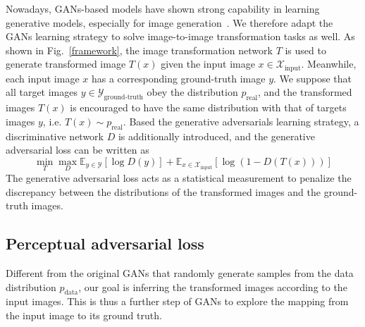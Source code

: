 \documentclass{article}
\begin{document}
Nowadays, GANs-based models have shown strong capability in learning generative models, especially for image generation~\cite{arjovsky2017wasserstein, lotter2015unsupervised, chen2016infogan}. We therefore adapt the GANs learning strategy to solve image-to-image transformation tasks as well. As shown in Fig.~\ref{framework}, the image transformation network $T$ is used to generate transformed image $T(x)$ given the input image $x \in \mathcal{X}_\text{input}$. Meanwhile, each input image $x$ has a corresponding ground-truth image $y$. 
We suppose that all target images $y \in \mathcal{Y}_\text{ground-truth}$ obey the distribution $p_\text{real}$, and the transformed images $T(x)$ is encouraged to have the same distribution with that of targets images $y$, i.e. $T(x) \sim p_\text{real}$. Based the generative adversarials learning strategy, a discriminative network $D$ is additionally introduced, and the generative adversarial loss can be written as
\begin{equation}
\min_T \max_D \mathbb{E}_{y \in \mathcal{Y}}[\log D(y)] +\mathbb{E}_{x \in \mathcal{X}_\text{input}} [\log (1-D(T(x)))]
\end{equation} 
The generative adversarial loss acts as a statistical measurement to penalize the discrepancy between the distributions of the transformed images and the ground-truth images. 

\subsection{Perceptual adversarial loss}
Different from the original GANs that randomly generate samples from the data distribution $p_\text{data}$, our goal is inferring the transformed images according to the input images. This is thus a further step of GANs to explore the mapping from the input image to its ground truth. 
\end{document}
